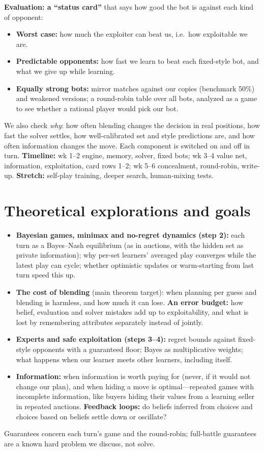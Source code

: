 \documentclass[10pt]{article}
\begin{document}
\textbf{Evaluation: a ``status card''} that says how good the bot is against each kind of opponent:
\begin{itemize}
\item \textbf{Worst case:} how much the exploiter can beat us, i.e.\ how exploitable we are.
\item \textbf{Predictable opponents:} how fast we learn to beat each fixed-style bot, and what we give up while learning.
\item \textbf{Equally strong bots:} mirror matches against our copies (benchmark 50\%) and weakened versions; a round-robin table over all bots, analyzed as a game to see whether a rational player would pick our bot.
\end{itemize}
We also check \emph{why}: how often blending changes the decision in real positions, how fast the solver settles, how well-calibrated set and style predictions are, and how often information changes the move. Each component is switched on and off in turn.
\textbf{Timeline:} wk 1--2 engine, memory, solver, fixed bots; wk 3--4 value net, information, exploitation, card rows 1--2; wk 5--6 concealment, round-robin, write-up. \textbf{Stretch:} self-play training, deeper search, human-mixing tests.

\section{Theoretical explorations and goals}
\begin{itemize}
\item \textbf{Bayesian games, minimax and no-regret dynamics (step 2):} each turn as a Bayes--Nash equilibrium (as in auctions, with the hidden set as private information); why per-set learners' averaged play converges while the latest play can cycle; whether optimistic updates or warm-starting from last turn speed this up.
\item \textbf{The cost of blending} (main theorem target): when planning per guess and blending is harmless, and how much it can lose. \textbf{An error budget:} how belief, evaluation and solver mistakes add up to exploitability, and what is lost by remembering attributes separately instead of jointly.
\item \textbf{Experts and safe exploitation (steps 3--4):} regret bounds against fixed-style opponents with a guaranteed floor; Bayes as multiplicative weights; what happens when our learner meets other learners, including itself.
\item \textbf{Information:} when information is worth paying for (never, if it would not change our plan), and when hiding a move is optimal---repeated games with incomplete information, like buyers hiding their values from a learning seller in repeated auctions. \textbf{Feedback loops:} do beliefs inferred from choices and choices based on beliefs settle down or oscillate?
\end{itemize}
Guarantees concern each turn's game and the round-robin; full-battle guarantees are a known hard problem we discuss, not solve.
\end{document}
